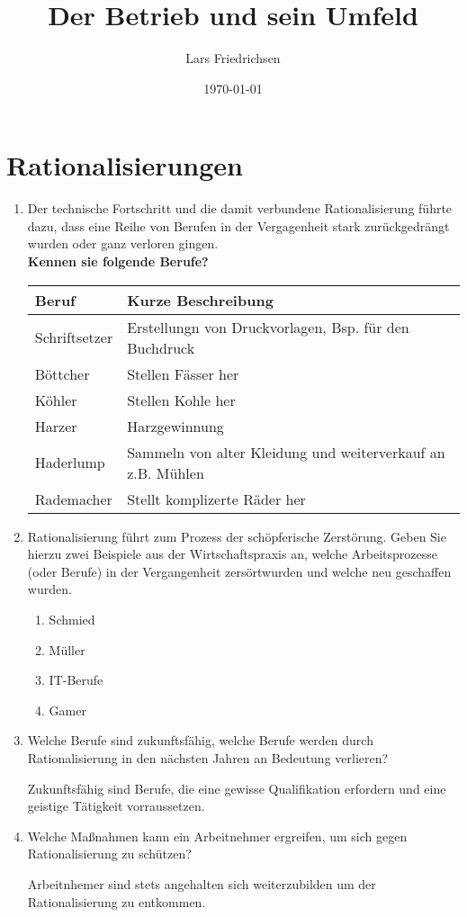 \documentclass[a4paper,11pt]{scrartcl}		%
\title{Der Betrieb und sein Umfeld}
\author{Lars Friedrichsen}
\date{\today}
\begin{document}
\section{Rationalisierungen}

\begin{enumerate}
	\item Der technische Fortschritt und die damit verbundene Rationalisierung führte dazu, dass
		eine Reihe von Berufen in der Vergagenheit stark zurückgedrängt wurden oder ganz verloren gingen.\\
		\textbf{Kennen sie folgende Berufe?}\par
		\begin{tabular}{|l|l|}
			\hline
			Beruf			&	Kurze Beschreibung\\ \hline
			Schriftsetzer		&	Erstellungn von Druckvorlagen, Bsp. für den Buchdruck\\ \hline
			Böttcher		&	Stellen Fässer her\\ \hline
			Köhler			&	Stellen Kohle her\\ \hline
			Harzer			&	Harzgewinnung\\ \hline
			Haderlump		&	Sammeln von alter Kleidung und weiterverkauf an z.B. Mühlen\\ \hline
			Rademacher		&	Stellt komplizerte Räder her\\ \hline
		\end{tabular}
	\item Rationalisierung führt zum Prozess der \glqq schöpferische Zerstörung\grqq. Geben Sie hierzu zwei Beispiele aus
		der Wirtschaftspraxis an, welche Arbeitsprozesse (oder Berufe) in der Vergangenheit \glqq zersört\grqq wurden
		und welche neu geschaffen wurden.\par
		\begin{enumerate}
			\item Schmied
			\item Müller
			\item IT-Berufe
			\item Gamer
		\end{enumerate}
	\item Welche Berufe sind zukunftsfähig, welche Berufe werden durch Rationalisierung in den nächsten Jahren an
		Bedeutung verlieren?\par
		Zukunftsfähig sind Berufe, die eine gewisse Qualifikation erfordern und eine geistige Tätigkeit vorraussetzen.
	\item Welche Maßnahmen kann ein Arbeitnehmer ergreifen, um sich gegen Rationalisierung zu schützen?\par
		Arbeitnhemer sind stets angehalten sich weiterzubilden um der Rationalisierung zu entkommen.
\end{enumerate}
\end{document}
